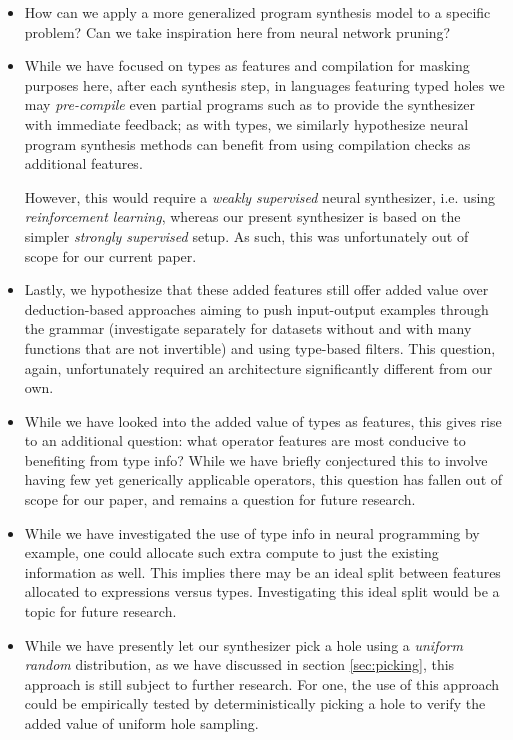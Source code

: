 \documentclass{article}
\begin{document}
\begin{itemize}
    \item How can we apply a more generalized program synthesis model to a specific problem?
    Can we take inspiration here from neural network pruning?
    \item While we have focused on types as features and compilation for masking purposes here,
    after each synthesis step,
    in languages featuring typed holes we may \emph{pre-compile} even partial programs such as to provide the synthesizer with immediate feedback;
    as with types, we similarly hypothesize neural program synthesis methods can benefit from using compilation checks as additional features.

    However, this would require a \emph{weakly supervised} neural synthesizer,
    i.e. using \emph{reinforcement learning},
    whereas our present synthesizer is based on the simpler \emph{strongly supervised} setup.
    As such, this was unfortunately out of scope for our current paper.
    \item Lastly, we hypothesize that these added features still offer added value over
    deduction-based approaches aiming to push input-output examples through the grammar
    (investigate separately for datasets without and with many functions that are not invertible)
    and using type-based filters.
    This question, again, unfortunately required an architecture significantly different from our own.
    \item While we have looked into the added value of types as features,
    this gives rise to an additional question:
    what operator features are most conducive to benefiting from type info?
    While we have briefly conjectured this to involve having few yet generically applicable operators,
    this question has fallen out of scope for our paper,
    and remains a question for future research.
    \item While we have investigated the use of type info in neural programming by example,
    one could allocate such extra compute to just the existing information as well.
    This implies there may be an ideal split between features allocated to expressions versus types.
    Investigating this ideal split would be a topic for future research.
    \item While we have presently let our synthesizer pick a hole using a \emph{uniform random} distribution,
    as we have discussed in section \ref{sec:picking},
    this approach is still subject to further research.
    For one, the use of this approach could be empirically tested by deterministically picking a hole to verify the added value of uniform hole sampling.

\end{itemize}
\end{document}
